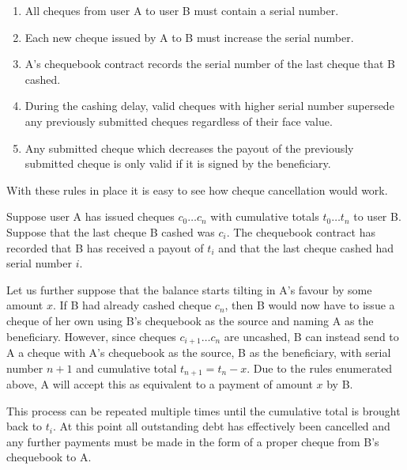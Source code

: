 \begin{enumerate}
    \item All cheques from user A to user B must contain a serial number.
    \item Each new cheque issued by A to B must increase the serial number.
    \item A's chequebook contract records the serial number of the last cheque that B cashed.
    \item During the cashing delay, valid cheques with higher serial number supersede any previously submitted cheques regardless of their face value.
    \item Any submitted cheque which decreases the payout of the previously submitted cheque is only valid if it is signed by the beneficiary.
\end{enumerate}

With these rules in place it is easy to see how cheque cancellation would work. 


Suppose user A has issued cheques $c_0 \ldots c_n$ with cumulative totals $t_0 \ldots t_n$ to user B. Suppose that the last cheque B cashed was $c_i$. The chequebook contract has recorded that B has received a payout of $t_i$ and that the last cheque cashed had serial number $i$.

Let us further suppose that the balance starts tilting in A's favour by some amount $x$. If B had already cashed cheque $c_n$, then B would now have to issue a cheque of her own using B's chequebook as the source and naming A as the beneficiary. However, since cheques $c_{i+1} \ldots c_n$  are uncashed, B can instead send to A a cheque with A's chequebook as the source, B as the beneficiary, with serial number $n+1$ and cumulative total $t_{n+1} = t_n - x$. Due to the rules enumerated above, A will accept this as equivalent to a payment of amount $x$ by B.

This process can be repeated multiple times until the cumulative total is brought back to $t_i$. At this point all outstanding debt has effectively been cancelled and any further payments must be made in the form of a proper cheque from B's chequebook to A.


